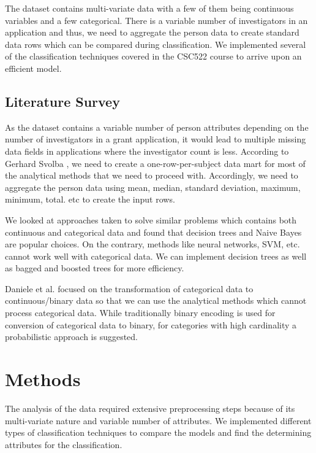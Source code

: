 \documentclass{article} %
\begin{document}
	The dataset contains multi-variate data with a few of them being continuous variables and a few categorical. There is a variable number of investigators in an application and thus, we need to aggregate the person data to create standard data rows which can be compared during classification. We implemented several of the classification techniques covered in the CSC522 course to arrive upon an efficient model.
	
	
	\subsection{Literature Survey}
	
	As the dataset contains a variable number of person attributes depending on the number of investigators in a grant application, it would lead to multiple missing data fields in applications where the investigator count is less. According to Gerhard Svolba \cite{OneRow}, we need to create a one-row-per-subject data mart for most of the analytical methods that we need to proceed with. Accordingly, we need to aggregate the person data using mean, median, standard deviation, maximum, minimum, total. etc to create the input rows.
	
	We looked at approaches taken to solve similar problems which contains both continuous and categorical data \cite{Matlab} and found that decision trees and Naive Bayes are popular choices. On the contrary, methods like neural networks, SVM, etc. cannot work well with categorical data. We can implement decision trees as well as bagged and boosted trees for more efficiency. 
	
	Daniele et al. \cite{HighCard} focused on the transformation of categorical data to continuous/binary data so that we can use the analytical methods which cannot process categorical data. While traditionally binary encoding is used for conversion of categorical data to binary, for categories with high cardinality a probabilistic approach is suggested.
	
	\section{Methods}
	
	The analysis of the data required extensive preprocessing steps because of its multi-variate nature and variable number of attributes. We implemented different types of classification techniques to compare the models and find the determining attributes for the classification.
	
\end{document}
